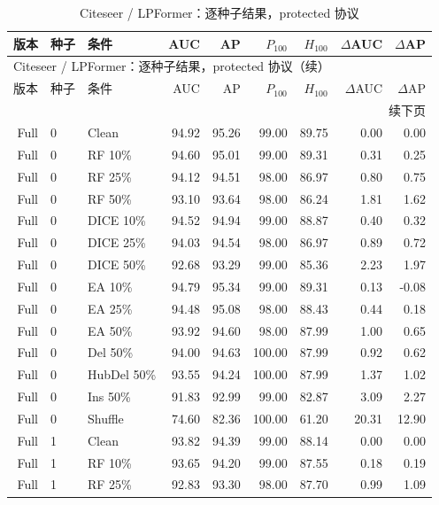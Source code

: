 {\footnotesize
\setlength{\tabcolsep}{3.2pt}
\renewcommand{\arraystretch}{1.10}
\begin{longtable}{rllrrrrrr}
\caption{Citeseer / LPFormer：逐种子结果，protected 协议}\\
\toprule
版本 & 种子 & 条件 & AUC & AP & $P_{100}$ & $H_{100}$ & $\Delta$AUC & $\Delta$AP \\
\midrule
\endfirsthead
\multicolumn{9}{l}{Citeseer / LPFormer：逐种子结果，protected 协议（续）}\\
\toprule
版本 & 种子 & 条件 & AUC & AP & $P_{100}$ & $H_{100}$ & $\Delta$AUC & $\Delta$AP \\
\midrule
\endhead
\midrule\multicolumn{9}{r}{续下页}\\
\endfoot
\bottomrule
\endlastfoot
Full & 0 & Clean & 94.92 & 95.26 & 99.00 & 89.75 & 0.00 & 0.00 \\
Full & 0 & RF 10\% & 94.60 & 95.01 & 99.00 & 89.31 & 0.31 & 0.25 \\
Full & 0 & RF 25\% & 94.12 & 94.51 & 98.00 & 86.97 & 0.80 & 0.75 \\
Full & 0 & RF 50\% & 93.10 & 93.64 & 98.00 & 86.24 & 1.81 & 1.62 \\
Full & 0 & DICE 10\% & 94.52 & 94.94 & 99.00 & 88.87 & 0.40 & 0.32 \\
Full & 0 & DICE 25\% & 94.03 & 94.54 & 98.00 & 86.97 & 0.89 & 0.72 \\
Full & 0 & DICE 50\% & 92.68 & 93.29 & 99.00 & 85.36 & 2.23 & 1.97 \\
Full & 0 & EA 10\% & 94.79 & 95.34 & 99.00 & 89.31 & 0.13 & -0.08 \\
Full & 0 & EA 25\% & 94.48 & 95.08 & 98.00 & 88.43 & 0.44 & 0.18 \\
Full & 0 & EA 50\% & 93.92 & 94.60 & 98.00 & 87.99 & 1.00 & 0.65 \\
Full & 0 & Del 50\% & 94.00 & 94.63 & 100.00 & 87.99 & 0.92 & 0.62 \\
Full & 0 & HubDel 50\% & 93.55 & 94.24 & 100.00 & 87.99 & 1.37 & 1.02 \\
Full & 0 & Ins 50\% & 91.83 & 92.99 & 99.00 & 82.87 & 3.09 & 2.27 \\
Full & 0 & Shuffle & 74.60 & 82.36 & 100.00 & 61.20 & 20.31 & 12.90 \\
Full & 1 & Clean & 93.82 & 94.39 & 99.00 & 88.14 & 0.00 & 0.00 \\
Full & 1 & RF 10\% & 93.65 & 94.20 & 99.00 & 87.55 & 0.18 & 0.19 \\
Full & 1 & RF 25\% & 92.83 & 93.30 & 98.00 & 87.70 & 0.99 & 1.09 \\

\end{longtable}}
